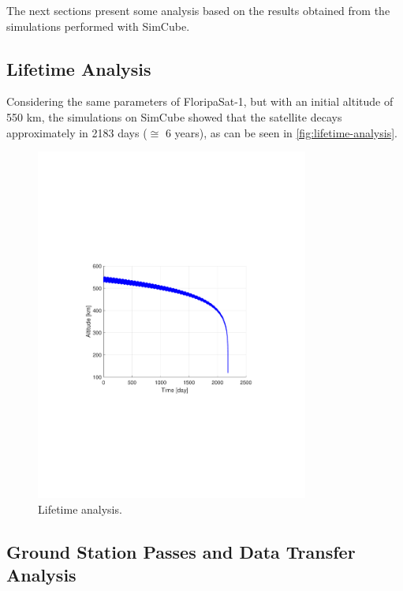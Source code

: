 The next sections present some analysis based on the results obtained from the simulations performed with SimCube.%


\subsection{Lifetime Analysis}

Considering the same parameters of FloripaSat-1, but with an initial altitude of 550 km, the simulations on SimCube showed that the satellite decays approximately in 2183 days ($\cong$ 6 years), as can be seen in \autoref{fig:lifetime-analysis}.

\begin{figure}[!ht]
    \begin{center}
        \includegraphics[trim=3.5cm 8cm 4.0cm 8cm,clip, width=0.8\textwidth]{curves/Altitude.pdf}
        \caption{Lifetime analysis.}
        \label{fig:lifetime-analysis}
    \end{center}
\end{figure}

\subsection{Ground Station Passes and Data Transfer Analysis}

